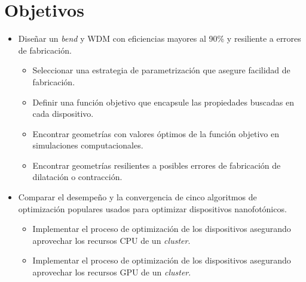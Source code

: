 \section{Objetivos}

\begin{itemize}

  \item Diseñar un \emph{bend} y WDM con eficiencias mayores al 90\% y resiliente a errores de fabricación.

  \begin{itemize}

    \item Seleccionar una estrategia de parametrización que asegure facilidad de fabricación.

    \item Definir una función objetivo que encapsule las propiedades buscadas en cada dispositivo.

    \item Encontrar geometrías con valores óptimos de la función objetivo en simulaciones computacionales.

    \item Encontrar geometrías resilientes a posibles errores de fabricación de dilatación o contracción.

  \end{itemize}

  \item Comparar el desempeño y la convergencia de cinco algoritmos de optimización populares usados para optimizar dispositivos nanofotónicos.

  \begin{itemize}

    \item Implementar el proceso de optimización de los dispositivos asegurando aprovechar los
      recursos CPU de un \emph{cluster}.

    \item Implementar el proceso de optimización de los dispositivos asegurando aprovechar los
      recursos GPU de un \emph{cluster}.

  \end{itemize}

\end{itemize}






